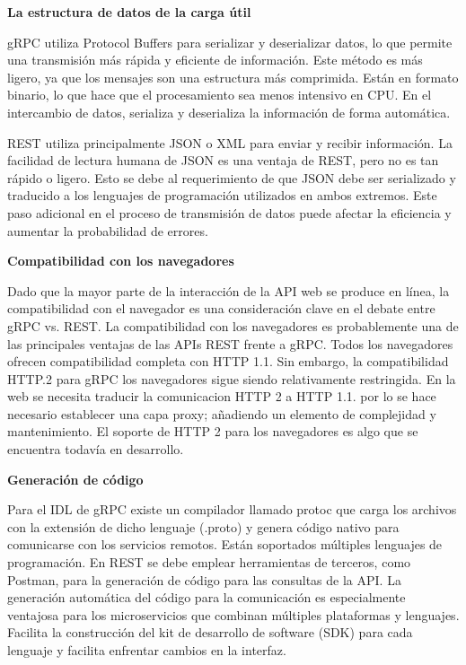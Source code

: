 \textbf{La estructura de datos de la carga útil}

gRPC utiliza Protocol Buffers para serializar y deserializar datos, lo que permite una transmisión más rápida y eficiente de información. Este método es más ligero, ya que los mensajes son una estructura más comprimida. Están en formato binario, lo que hace que el procesamiento sea menos intensivo en CPU. En el intercambio de datos, serializa y deserializa la información de forma automática.

REST utiliza principalmente JSON o XML para enviar y recibir información. La facilidad de lectura humana de JSON es una ventaja de REST, pero no es tan rápido o ligero. Esto se debe al requerimiento de que JSON debe ser serializado y traducido a los lenguajes de programación utilizados en ambos extremos. Este paso adicional en el proceso de transmisión de datos puede afectar la eficiencia y aumentar la probabilidad de errores.


\textbf{Compatibilidad con los navegadores}\label{GRPCcompatibilidadConNavegadores}

Dado que la mayor parte de la interacción de la API web se produce en línea, la compatibilidad con el navegador es una consideración clave en el debate entre gRPC vs. REST. La compatibilidad con los navegadores es probablemente una de las principales ventajas de las APIs REST frente a gRPC. Todos los navegadores ofrecen compatibilidad completa con HTTP 1.1. Sin embargo, la compatibilidad HTTP.2 para gRPC los navegadores sigue siendo relativamente restringida. En la web se necesita traducir la comunicacion  HTTP 2 a HTTP 1.1. por lo se hace necesario establecer una capa proxy; añadiendo un elemento de complejidad y mantenimiento. El soporte de HTTP 2 para los navegadores es algo que se encuentra todavía en desarrollo.

\textbf{Generación de código}

Para el IDL de gRPC existe un compilador llamado protoc que carga los archivos con la extensión de dicho lenguaje (.proto) y genera código nativo para comunicarse con los servicios remotos. Están soportados múltiples lenguajes de programación. En REST se debe emplear herramientas de terceros, como Postman, para la generación de código para las consultas de la API. La generación automática del código para la comunicación es especialmente ventajosa para los microservicios que combinan múltiples plataformas y lenguajes. Facilita la construcción del kit de desarrollo de software (SDK) para cada lenguaje y facilita enfrentar cambios en la interfaz.

